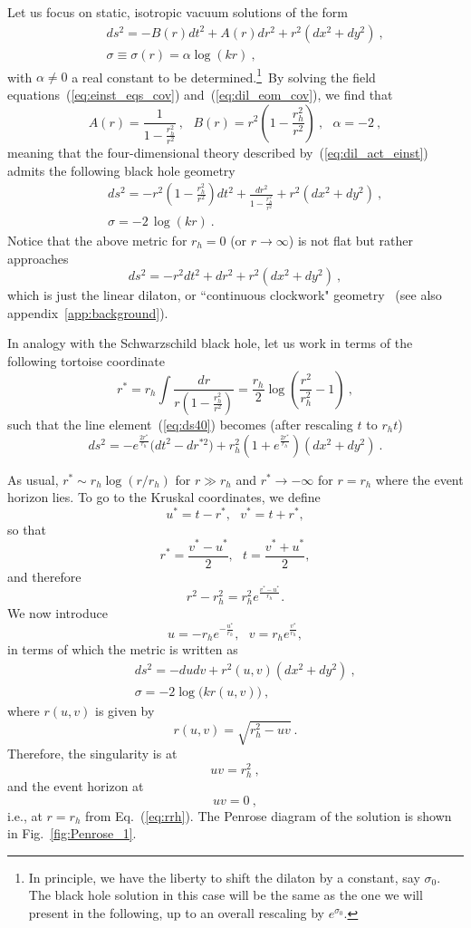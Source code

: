 \documentclass[a4paper, 12pt]{article}
\def\s{\sigma}
\def\be{\begin{equation}}
\def\ee{\end{equation}}
\def\bea{\begin{eqnarray}}
\def\eea{\end{eqnarray}}
\begin{document}
Let us focus on static, isotropic vacuum solutions of the form
\bea
&&ds^2 = -B(r) dt^2 + A(r) dr^2 +r^2\left(dx^2+dy^2\right) \ ,\\
&&\sigma\equiv \sigma(r)=\alpha \log(k r) \ , 
\eea
with $\alpha\neq 0$ a real constant to be determined.\footnote{In principle, we have the liberty to shift the dilaton by a constant, say $\s_0$. The black hole solution in this case will be the same as the one we will present in the following, up to an overall rescaling by  $e^{\s_0}$.}~By solving the field equations~(\ref{eq:einst_eqs_cov}) and~(\ref{eq:dil_eom_cov}), we find that 
\be 
A(r) = \frac{1}{1-\frac{r_h^2}{r^2}} \ ,~~~B(r) = 
r^2\left(1-\frac{r_h^2}{r^2}\right) \ ,~~~\alpha=-2 \ ,
\ee
meaning that the four-dimensional theory described by~(\ref{eq:dil_act_einst}) admits the following black hole geometry
\bea
&&d s^2=-r^2\left(1-\frac{r_h^2}{r^2}\right)d t^2+\frac{d r^2}{1-\frac{r_h^2}{r^2}}+r^2\left(d x^2+d y^2\right) \ ,\label{eq:ds40}\\
&&\sigma=-2\, \log (k r)\ . \label{eq:s1} 
\eea
Notice that the above metric for $r_h=0$ (or $r\to\infty$) is not flat but rather approaches
\be
\label{eq:linear1} 
ds^2 =  -r^2dt^2 + dr^2 + r^2(dx^2+dy^2) \ , 
\ee
which is just the linear dilaton, or ``continuous clockwork" geometry~\cite{Giudice1,*Giudice2,KR1,*KR2} (see also appendix~\ref{app:background}).  

In analogy with the Schwarzschild black hole, let us work in terms of the following tortoise coordinate 
\be
r^*=r_h\int \frac{dr}{r\left(1-\frac{r_h^2}{r^2}\right)}=\frac{r_h}{2}\log\left(\frac{r^2}{r_h^2}-1\right) \ ,
\ee
such that the line element~(\ref{eq:ds40}) becomes (after rescaling $t$ to $r_h t$)
\be
\label{eq:tor}
d s^2=-e^{\frac{2r^*}{r_h}}\Big(d t^2-d r^{*2}\Big)+r_h^2\left(1+e^{\frac{2r^*}{r_h}}\right)\left(dx^2+d y^2\right) \ . 
\ee

As usual, $r^*\sim r_h\log (r/r_h)$ for $r\gg r_h$
and $r^*\to -\infty$ for $r=r_h$ where the event horizon lies. To go to the Kruskal coordinates, we define
\be
\label{eq:uvstar}
u^*=t-r^*,~~~v^* =t+r^*,
\ee
so that
\be
r^*=\frac{v^*-u^*}{2}, ~~~t=\frac{v^*+u^*}{2},
\ee
and therefore
\be
r^2-r_h^2=r_h^2 e^{\frac{v^*-u^*}{r_h}}.
\ee
We now introduce 
\be
\label{eq:uv}
u=-r_he^{-\frac{u^*}{r_h}}, ~~~v=r_h e^{\frac{v^*}{r_h}},
\ee
in terms of which the metric is written as
\bea
\label{eq:met_einstein_frame}
&&d s^2=-d u d v+r^2(u,v)\left(d x^2+d y^2\right) \ , \\
&&\sigma=-2\log\big(kr(u,v)\big) \ ,
\eea
where $r(u,v)$ is given by 
\be
\label{eq:rrh}
r(u,v)= \sqrt{r_h^2-u v} \ . 
\ee
Therefore, the singularity is at 
\be
uv=r_h^2 \ ,
\ee
and the event horizon at 
\be
u v=0 \ ,
\ee
i.e., at $r=r_h$ from Eq.~(\ref{eq:rrh}).  
The Penrose diagram of the solution is shown in Fig.~\ref{fig:Penrose_1}. 
\end{document}
